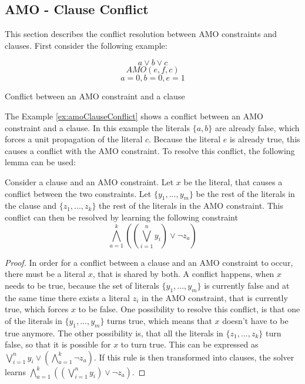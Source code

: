 \subsection{AMO - Clause Conflict}

This section describes the conflict resolution between AMO constraints and clauses. First consider the following example:

\begin{example}
\begin{leftbar}
\begin{displaymath}
a \vee b \vee c
\end{displaymath}
\begin{displaymath}
AMO(e,f,c)
\end{displaymath}
\begin{displaymath}
a = 0, b = 0, e = 1
\end{displaymath}
\end{leftbar}
\caption{Conflict between an AMO constraint and a clause}
\label{ex:amoClauseConflict}
\end{example}

The Example \ref{ex:amoClauseConflict} shows a conflict between an AMO constraint and a clause. In this example the literals $\{a,b\}$ are already false, which forces a unit propagation of the literal $c$. Because the literal $e$ is already true, this causes a conflict with the AMO constraint. To resolve this conflict, the following lemma can be used:

\begin{lemma}
\begin{leftbar}
Consider a clause and an AMO constraint. Let $x$ be the literal, that causes a conflict between the two constraints. Let $\{y_1,...,y_m\}$ be the rest of the literals in the clause and $\{z_1,...,z_k\}$ the rest of the literals in the AMO constraint.
This conflict can then be resolved by learning the following constraint
\begin{displaymath}
\bigwedge_{a=1}^{k}((\bigvee_{i=1}^{n}y_i)\vee \neg z_a)
\end{displaymath}

\end{leftbar}
\label{le:amoClauseConflict}
\end{lemma}

\begin{proof}
In order for a conflict between a clause and an AMO constraint to occur, there must be a literal $x$, that is shared by both. A conflict happens, when $x$ needs to be true, because the set of literals $\{y_1,...,y_m\}$ is currently false and at the same time there exists a literal $z_i$ in the AMO constraint, that is currently true, which forces $x$ to be false. One possibility to resolve this conflict, is that one of the literals in $\{y_1,...,y_m\}$ turns true, which means that $x$ doesn't have to be true anymore. The other possibility is, that all the literals in $\{z_1,...,z_k\}$ turn false, so that it is possible for $x$ to turn true. This can be expressed as $\bigvee_{i=1}^{n}y_i \vee (\bigwedge_{a=1}^{k}\neg z_a)$. If this rule is then transformed into clauses, the solver learns $\bigwedge_{a=1}^{k}((\bigvee_{i=1}^{n}y_i)\vee \neg z_a)$.
\end{proof}

